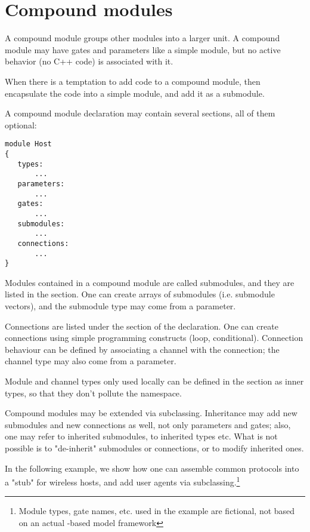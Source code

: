 \section{Compound modules}

A compound module groups other modules into a larger unit. A compound
module may have gates and parameters like a simple module, but
no active behavior (no C++ code) is associated with it.

\begin{note}
    When there is a temptation to add code to a compound module,
    then encapsulate the code into a simple module, and add it as
    a submodule.
\end{note}

A compound module declaration may contain several sections,
all of them optional:

\begin{Verbatim}
module Host
{
   types:
       ...
   parameters:
       ...
   gates:
       ...
   submodules:
       ...
   connections:
       ...
}
\end{Verbatim}

Modules contained in a compound module are called submodules, and they are
listed in the  section. One can create arrays of submodules
(i.e. submodule vectors), and the submodule type may come from a parameter.

Connections are listed under the  section of the
declaration. One can create connections using simple programming constructs
(loop, conditional). Connection behaviour can be defined by associating a
channel with the connection; the channel type may also come from a
parameter.

Module and channel types only used locally can be defined in the
 section as inner types, so that they don't pollute the
namespace.

Compound modules may be extended via subclassing. Inheritance may add new
submodules and new connections as well, not only parameters and gates;
also, one may refer to inherited submodules, to inherited types etc. What
is not possible is to "de-inherit" submodules or connections, or to modify
inherited ones.

In the following example, we show how one can assemble common protocols
into a "stub" for wireless hosts, and add user agents via
subclassing.\footnote{Module types, gate names, etc. used in the example
are fictional, not based on an actual {\opp}-based model framework}

